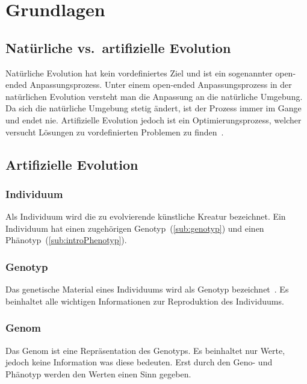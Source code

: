 %
%


\chapter{Grundlagen}

  \section{Natürliche vs.\ artifizielle Evolution}

    Natürliche Evolution hat kein vordefiniertes Ziel und ist ein sogenannter open-ended Anpassungsprozess.
    Unter einem open-ended Anpassungsprozess in der natürlichen Evolution
    versteht man die Anpassung an die natürliche Umgebung.
    Da sich die natürliche Umgebung stetig ändert, ist der Prozess immer im Gange und endet nie.
    Artifizielle Evolution jedoch ist ein Optimierungsprozess,
    welcher versucht Lösungen zu vordefinierten Problemen zu finden~\cite[S.1]{book:bioInspired}.

  \section{Artifizielle Evolution}

    \subsection{Individuum\label{sub:individual}}

      Als Individuum wird die zu evolvierende künstliche Kreatur bezeichnet.
      Ein Individuum hat einen zugehörigen Genotyp~(\vref{sub:genotyp}) und einen Phänotyp~(\vref{sub:introPhenotyp}).

    \subsection{Genotyp\label{sub:genotyp}}

      Das genetische Material eines Individuums wird als Genotyp bezeichnet~\cite[S.5]{book:bioInspired}.
      Es beinhaltet alle wichtigen Informationen zur Reproduktion des Individuums.

    \subsection{Genom\label{sub:genom}}

      Das Genom ist eine Repräsentation des Genotyps.
      Es beinhaltet nur Werte, jedoch keine Information was diese bedeuten.
      Erst durch den Geno- und Phänotyp werden den Werten einen Sinn gegeben.

